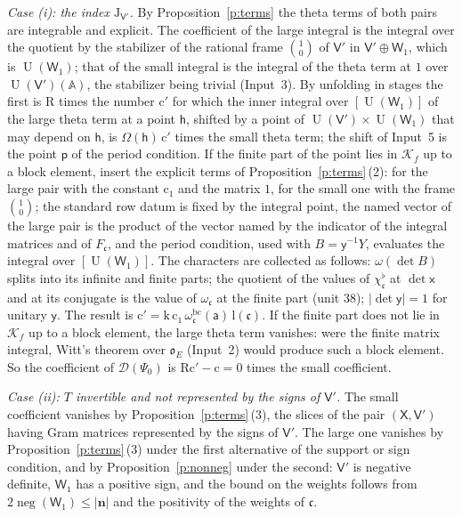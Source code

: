 \documentclass[11pt,a4paper]{article}
\makeatletter
\theoremstyle{plainx}
\theoremstyle{uprightx}
\renewenvironment{proof}[1][Proof]{\par\pushQED{\qed}\normalfont\topsep0pt\partopsep0pt
  \trivlist\item[\hskip\labelsep\itshape #1.]\ignorespaces}{\popQED\endtrivlist\@endpefalse}
\newcommand{\dS}{\Psi}                 %
\newcommand{\bn}{\mathbf{n}}
\newcommand{\sW}{\mathsf{W}}
\newcommand{\sV}{\mathsf{V}}
\newcommand{\sX}{\mathsf{X}}
\newcommand{\sh}{\mathsf{h}}
\newcommand{\sx}{\mathsf{x}}
\newcommand{\sy}{\mathsf{y}}
\newcommand{\fc}{\mathfrak{c}}
\newcommand{\rc}{\mathrm{c}}
\newcommand{\A}{\mathbb{A}}
\newcommand{\U}{\operatorname{U}}
\newcommand{\cD}{\mathcal{D}}
\newcommand{\inu}[1]{#1^{\flat}}
\newcommand{\negc}{\operatorname{neg}}
\makeatother
\begin{document}
\begin{proof}[Proof of Theorem 3]
\emph{Case \textup{(i)}: the index $\mathrm{J}_{\sV'}$.} By Proposition~\ref{p:terms} the theta terms of both
pairs are integrable and explicit. The coefficient of the large integral is the integral over the quotient by the
stabilizer of the rational frame $\binom{1}{0}$ of $\sV'$ in $\sV'\oplus\sW_1$, which is $\U(\sW_1)$; that of the
small integral is the integral of the theta term at $1$ over $\U(\sV')(\A)$, the stabilizer being trivial
(Input~3). By unfolding in stages the first is $\mathrm{R}$ times the number $\rc'$ for which the inner integral
over $[\U(\sW_1)]$ of the large theta term at a point $\sh$, shifted by a point of $\U(\sV')\times\U(\sW_1)$ that
may depend on $\sh$, is $\Omega(\sh)\,\rc'$ times the small theta term; the shift of Input~5 is the point
$\mathsf{p}$ of the period condition. If the finite part of the point lies in $\mathcal{K}_f$ up to a block element, insert the explicit terms of
Proposition~\ref{p:terms}\,(2): for the large pair with the constant $\rc_1$ and the matrix $1$, for the small one
with the frame $\binom10$; the standard row datum is fixed by the integral point, the named vector of the large
pair is the product of the vector named by the indicator of the integral matrices and of $F_{\fc}$, and the
period condition, used with $B=\sy^{-1}Y$, evaluates the integral over $[\U(\sW_1)]$. The characters are collected
as follows: $\omega(\det B)$ splits into its infinite and finite parts; the quotient of the values of
$\inu{\chi_{\fc}}$ at $\det\sx$ and at its conjugate is the value of $\omega_{\fc}$ at the finite part (unit 38);
$|\det\sy|=1$ for unitary $\sy$. The result is $\rc'=\mathrm{k}\,\rc_1\,\omega^{\mathrm{bc}}_{\fc}(\mathsf{a})\,\mathrm{l}(\fc)$.
If the finite part does not lie in $\mathcal{K}_f$ up to a block element, the large theta term vanishes: were the
finite matrix integral, Witt's theorem over $\hat{\mathfrak{o}}_E$ (Input~2) would produce such a block element. So
the coefficient of $\cD(\dS_0)$ is $\mathrm{R}\rc'-\rc=0$ times the small coefficient.

\emph{Case \textup{(ii)}: $T$ invertible and not represented by the signs of $\sV'$.} The small coefficient
vanishes by Proposition~\ref{p:terms}\,(3), the slices of the pair $(\sX,\sV')$ having Gram matrices represented
by the signs of $\sV'$. The large one vanishes by Proposition~\ref{p:terms}\,(3) under the first alternative of
the support or sign condition, and by Proposition~\ref{p:nonneg} under the second: $\sV'$ is negative definite,
$\sW_1$ has a positive sign, and the bound on the weights follows from $2\negc(\sW_1)\le|\bn|$ and the positivity
of the weights of $\fc$.
\end{proof}
\end{document}
